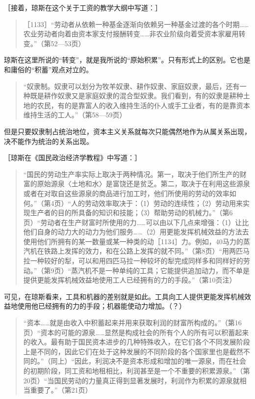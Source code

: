 ［接着，琼斯在这个关于工资的教学大纲中写道：］

\begin{quote}{［1133］“劳动者从依赖一种基金逐渐向依赖另一种基金过渡的各个时期……农业劳动者向着由资本家支付报酬转变……非农业阶级向着受资本家雇用转变。”（第52—53页）}\end{quote}

琼斯在这里所说的“转变”，就是我所说的“原始积累”。只有形式上的区别。它也是和庸俗的“积蓄”观点对立的。


\begin{quote}{“奴隶制。奴隶可以划分为牧羊奴隶、耕作奴隶、家庭奴隶，最后，还有一种既是耕作奴隶又是家庭奴隶的混合型奴隶。我们看到，有的奴隶是耕种土地的农民，有的是靠富人的收入维持生活的仆人或手工业者，有的是靠资本维持生活的工人。”（第58—59页）}\end{quote}

但是只要奴隶制占统治地位，资本主义关系就每次只能偶然地作为从属关系出现，决不能作为统治的关系出现。



［琼斯在《国民政治经济学教程》中写道：］

\begin{quote}{“国民的劳动生产率实际上取决于两种情况。第一，取决于他们所生产的财富的原始源泉〈土地和水〉是富饶还是贫乏。第二，取决于在利用这些源泉或者在对取自这些源泉的商品进行加工时，他们所使用的劳动的效率如何。”（第4页）“人的劳动效率取决于：（1）劳动的连续性；（2）劳动用来实现生产者的目的所具备的知识和技能；（3）帮助劳动的机械力。”（第6页）“劳动者在生产财富时所使用的力……可以由以下几点来增强：（1）让比他们自身的动力大的动力为他们服务……（2）用更能发挥机械效益的方法去使用他们所拥有的某一数量或某一种类的动［1134］力。例如，40马力的蒸汽机在铁路上发挥的效力，和在公路上发挥的就不同。”（第8页）“用两匹马拉一种较好的犁，可以和用四匹马拉一种较坏的犁完成同样多和同样好的劳动。”（第9页）“蒸汽机不是一种单纯的工具；它能提供追加动力，而不单是提供更能发挥机械效益地使用工人已经拥有的力的手段。”（第10页注）}\end{quote}

可见，在琼斯看来，工具和机器的差别就是如此。工具向工人提供更能发挥机械效益地使用他已经拥有的力的手段；机器能使动力增加。（？）

\begin{quote}{“资本……就是由收入中积蓄起来并用来获取利润的财富所构成的。”（第16页）“资本的可能的源泉……显然是构成社会的所有个人的所有可以积蓄起来的收入。最有助于国民资本进步的几种特殊收入，在它们各个不同发展阶段上是不同的，因此它们在处于这种发展的不同阶段的各个国家里也是截然不同的。”（同上）“因此，利润决不是资本形成和增加的唯一源泉，而在社会的初期阶段，同工资和地租相比，利润甚至是一个不重要的积累源泉。”（第20页）“当国民劳动的力量真正得到显著发展时，利润作为积累的源泉就相当重要了。”（第21页）}\end{quote}

